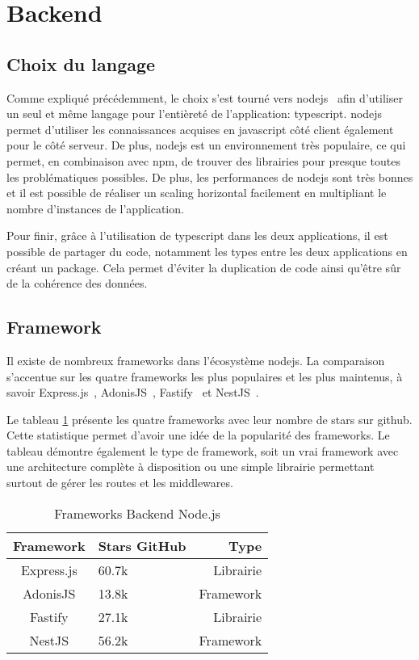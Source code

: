 \section{Backend}

\subsection{Choix du langage}

Comme expliqué précédemment, le choix s'est tourné vers \gls{nodejs}~\cite{nodejs} afin d'utiliser un seul et même langage pour l'entièreté de l'application: \gls{typescript}. \gls{nodejs} permet d'utiliser les connaissances acquises en \gls{javascript} côté client également pour le côté serveur. De plus, \gls{nodejs} est un environnement très populaire, ce qui permet, en combinaison avec \gls{npm}, de trouver des librairies pour presque toutes les problématiques possibles. De plus, les performances de \gls{nodejs} sont très bonnes et il est possible de réaliser un scaling horizontal facilement en multipliant le nombre d'instances de l'application.

Pour finir, grâce à l'utilisation de \gls{typescript} dans les deux applications, il est possible de partager du code, notamment les types entre les deux applications en créant un package. Cela permet d'éviter la duplication de code ainsi qu'être sûr de la cohérence des données.

\subsection{Framework}

Il existe de nombreux frameworks dans l'écosystème \gls{nodejs}. La comparaison s'accentue sur les quatre frameworks les plus populaires et les plus maintenus, à savoir Express.js~\cite{expressjs}, AdonisJS~\cite{adonisjs}, Fastify~\cite{fastify} et NestJS~\cite{nestjs}.

Le tableau \ref{tab:frameworks-backend-nodejs} présente les quatre frameworks avec leur nombre de stars sur \gls{github}. Cette statistique permet d'avoir une idée de la popularité des frameworks. Le tableau démontre également le type de framework, soit un vrai framework avec une architecture complète à disposition ou une simple librairie permettant surtout de gérer les routes et les middlewares.

\begin{table}[h]
  \begin{center}
    \caption{Frameworks Backend Node.js}
    \label{tab:frameworks-backend-nodejs}
    \begin{tabular}{c|l|r}
      Framework  & Stars GitHub & Type      \\ \hline
      Express.js & 60.7k        & Librairie \\
      AdonisJS   & 13.8k        & Framework \\
      Fastify    & 27.1k        & Librairie \\
      NestJS     & 56.2k        & Framework \\
    \end{tabular}
  \end{center}
\end{table}


